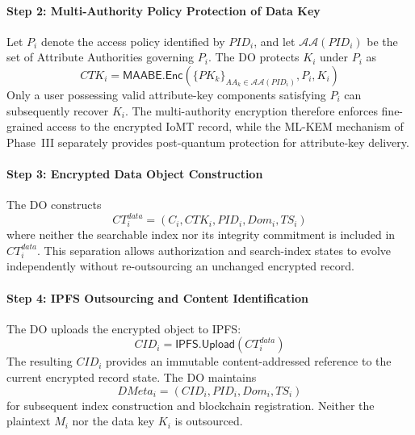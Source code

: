 \documentclass{ieeetj}
\theoremstyle{ieee-style}
\begin{document}
\paragraph*{Step 2: Multi-Authority Policy Protection of Data Key}

Let $P_i$ denote the access policy identified by $PID_i$, and let
$\mathcal{AA}(PID_i)$ be the set of Attribute Authorities governing
$P_i$. The DO protects $K_i$ under $P_i$ as
\begin{equation}
CTK_i=
\mathsf{MAABE.Enc}
\left(
\{PK_k\}_{AA_k\in\mathcal{AA}(PID_i)},
P_i,
K_i
\right)
\label{eq:data-key-protection}
\end{equation}
Only a user possessing valid attribute-key components satisfying $P_i$
can subsequently recover $K_i$. The multi-authority encryption therefore
enforces fine-grained access to the encrypted IoMT record, while the
ML-KEM mechanism of Phase~III separately provides post-quantum protection
for attribute-key delivery.

\paragraph*{Step 3: Encrypted Data Object Construction}

The DO constructs
\begin{equation}
CT_i^{data}
=
(C_i,CTK_i,PID_i,Dom_i,TS_i)
\label{eq:data-object}
\end{equation}
where neither the searchable index nor its integrity commitment is
included in $CT_i^{data}$. This separation allows authorization and
search-index states to evolve independently without re-outsourcing an
unchanged encrypted record.

\paragraph*{Step 4: IPFS Outsourcing and Content Identification}

The DO uploads the encrypted object to IPFS:
\begin{equation}
CID_i=
\mathsf{IPFS.Upload}(CT_i^{data})
\label{eq:ipfs-upload}
\end{equation}
The resulting $CID_i$ provides an immutable content-addressed reference
to the current encrypted record state. The DO maintains
\begin{equation}
DMeta_i=
(CID_i,PID_i,Dom_i,TS_i)
\label{eq:data-metadata}
\end{equation}
for subsequent index construction and blockchain registration. Neither
the plaintext $M_i$ nor the data key $K_i$ is outsourced.
\end{document}
